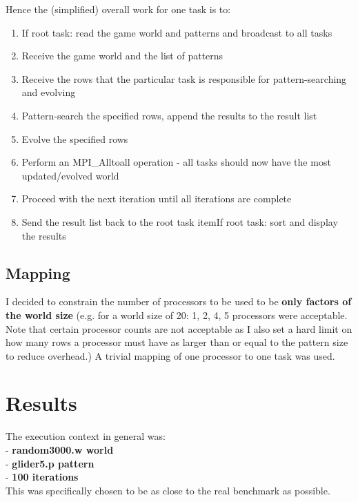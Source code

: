 \documentclass[12pt,a4paper]{article}
\begin{document}
Hence the (simplified) overall work for one task is to: \\
\begin{enumerate}
\item{If root task: read the game world and patterns and broadcast to all tasks}
\item{Receive the game world and the list of patterns}
\item{Receive the rows that the particular task is responsible for pattern-searching and evolving}
\item{Pattern-search the specified rows, append the results to the result list}
\item{Evolve the specified rows}
\item{Perform an MPI\_Alltoall operation - all tasks should now have the most updated/evolved world}
\item{Proceed with the next iteration until all iterations are complete}
\item{Send the result list back to the root task}
item{If root task: sort and display the results}
\end{enumerate}

\subsection{Mapping}
I decided to constrain the number of processors to be used to be \textbf{only factors of the world size} (e.g. for a world size of 20: 1, 2, 4, 5 processors were acceptable. Note that certain processor counts are not acceptable as I also set a hard limit on how many rows a processor must have as larger than or equal to the pattern size to reduce overhead.) A trivial mapping of one processor to one task was used. 

\newpage	

\section{Results}


The execution context in general was: \\

- \textbf{random3000.w world}\\
- \textbf{glider5.p pattern} \\
- \textbf{100 iterations}\\

This was specifically chosen to be as close to the real benchmark as possible.
\end{document}
